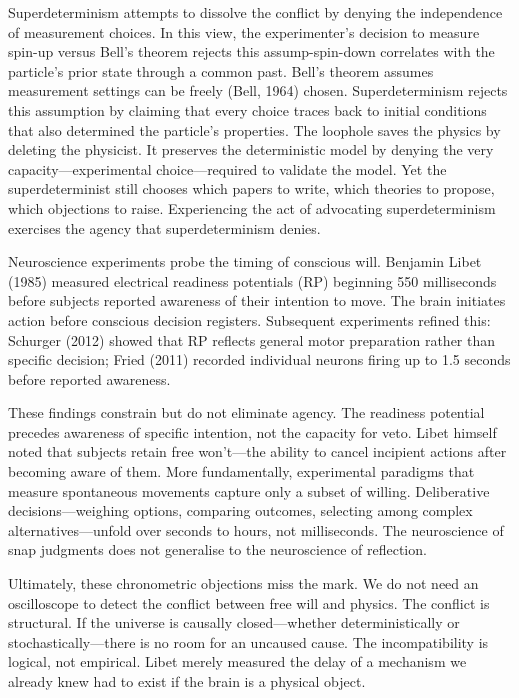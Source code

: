 Superdeterminism attempts to dissolve the conflict by denying the independence of measurement choices. In this view, the experimenter's decision to measure spin-up versus Bell's theorem rejects this assump-spin-down correlates with the particle's prior state through a common past. Bell's theorem assumes measurement settings can be freely (Bell, 1964) chosen. Superdeterminism rejects this assumption by claiming that every choice traces back to initial conditions that also determined the particle's properties. The loophole saves the physics by deleting the physicist. It preserves the deterministic model by denying the very capacity—experimental choice—required to validate the model. Yet the superdeterminist still chooses which papers to write, which theories to propose, which objections to raise. Experiencing the act of advocating superdeterminism exercises the agency that superdeterminism denies.

Neuroscience experiments probe the timing of conscious will. Benjamin Libet (1985) measured electrical readiness potentials (RP) beginning 550 milliseconds before subjects reported awareness of their intention to move. The brain initiates action before conscious decision registers. Subsequent experiments refined this: Schurger (2012) showed that RP reflects general motor preparation rather than specific decision; Fried (2011) recorded individual neurons firing up to 1.5 seconds before reported awareness.

These findings constrain but do not eliminate agency. The readiness potential precedes awareness of specific intention, not the capacity for veto. Libet himself noted that subjects retain \QSOpen{}free won't\QSClose{}—the ability to cancel incipient actions after becoming aware of them. More fundamentally, experimental paradigms that measure spontaneous movements capture only a subset of willing. Deliberative decisions—weighing options, comparing outcomes, selecting among complex alternatives—unfold over seconds to hours, not milliseconds. The neuroscience of snap judgments does not generalise to the neuroscience of reflection.

Ultimately, these chronometric objections miss the mark. We do not need an oscilloscope to detect the conflict between free will and physics. The conflict is structural. If the universe is causally closed—whether deterministically or stochastically—there is no room for an uncaused cause. The incompatibility is logical, not empirical. Libet merely measured the delay of a mechanism we already knew had to exist if the brain is a physical object.

